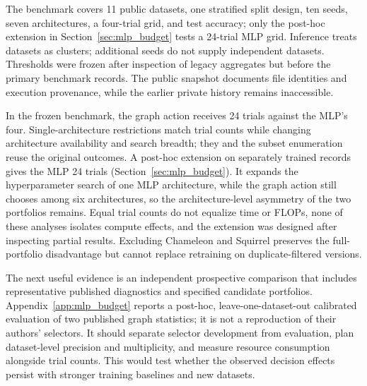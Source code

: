 The benchmark covers 11 public datasets, one stratified split design, ten seeds, seven architectures, a four-trial grid, and test accuracy; only the post-hoc extension in Section~\ref{sec:mlp_budget} tests a 24-trial MLP grid. Inference treats datasets as clusters; additional seeds do not supply independent datasets. Thresholds were frozen after inspection of legacy aggregates but before the primary benchmark records. The public snapshot documents file identities and execution provenance, while the earlier private history remains inaccessible.

In the frozen benchmark, the graph action receives 24 trials against the MLP's four. Single-architecture restrictions match trial counts while changing architecture availability and search breadth; they and the subset enumeration reuse the original outcomes. A post-hoc extension on separately trained records gives the MLP 24 trials (Section~\ref{sec:mlp_budget}). It expands the hyperparameter search of one MLP architecture, while the graph action still chooses among six architectures, so the architecture-level asymmetry of the two portfolios remains. Equal trial counts do not equalize time or FLOPs, none of these analyses isolates compute effects, and the extension was designed after inspecting partial results. Excluding Chameleon and Squirrel preserves the full-portfolio disadvantage but cannot replace retraining on duplicate-filtered versions.

The next useful evidence is an independent prospective comparison that includes representative published diagnostics and specified candidate portfolios. Appendix~\ref{app:mlp_budget} reports a post-hoc, leave-one-dataset-out calibrated evaluation of two published graph statistics; it is not a reproduction of their authors' selectors. It should separate selector development from evaluation, plan dataset-level precision and multiplicity, and measure resource consumption alongside trial counts. This would test whether the observed decision effects persist with stronger training baselines and new datasets.
